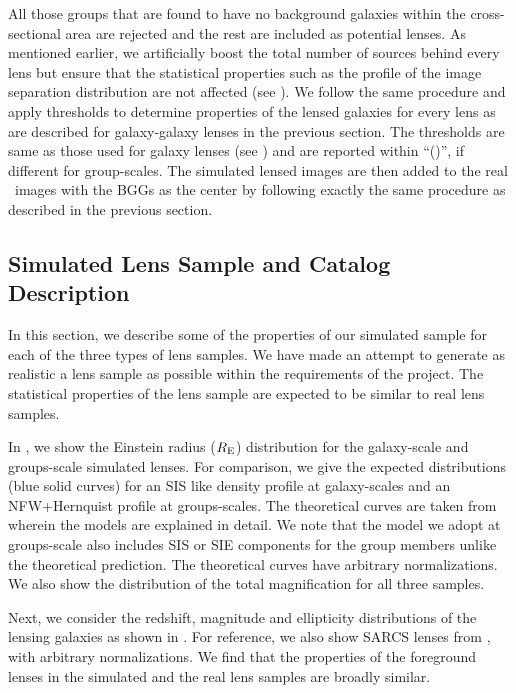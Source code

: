 \documentclass[useAMS,usenatbib,a4paper]{mn2e}
\begin{document}
All those groups that are found to have no background galaxies within the
cross-sectional area are rejected and the rest are included as potential lenses.
As mentioned earlier, we artificially boost the total number of sources behind
every lens but ensure that the statistical properties such as the profile of the
image separation distribution are not affected (see ). We
follow the same procedure and apply thresholds to determine properties
of the lensed galaxies for every lens as are described for galaxy-galaxy lenses
in the previous section. The thresholds are same as those used for
galaxy lenses (see ) and are reported within ``()'', if
different for group-scales. The simulated lensed images are then added
to the real \cfhtls~images with the BGGs as the center by following
exactly the same procedure as described in the previous section.


\subsection{Simulated Lens Sample and Catalog Description}

In this section, we describe some of the properties of our simulated sample for
each of the three types of lens samples. We have made an attempt to
generate as realistic a lens sample as possible within the requirements
of the \sw project. The statistical properties of the lens sample are
expected to be similar to real lens samples.

In , we show the Einstein radius ($R_{\rm E}$) distribution for the
galaxy-scale and groups-scale simulated lenses. For comparison, we give
the expected distributions (blue solid curves) for an SIS like density
profile at galaxy-scales and an NFW+Hernquist profile at groups-scales.
The theoretical curves are taken from \citet{More2012} wherein the
models are explained in detail. We note that the model we adopt at
groups-scale also includes SIS or SIE components for the group members
unlike the theoretical prediction. The theoretical curves have arbitrary
normalizations. We also show the distribution of the total magnification
for all three samples.

Next, we consider the redshift, magnitude and ellipticity distributions
of the lensing galaxies as shown in . For reference,
we also show SARCS lenses from \citet{More2012}, with arbitrary
normalizations. We find that the properties of the foreground lenses in
the simulated and the real lens samples are broadly similar.
\end{document}
